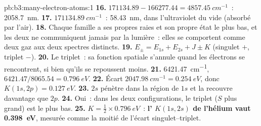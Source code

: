 \begin{solution}{pb:b3:many-electron-atoms:1}
\textbf{16.} $171134.89 - 166277.44 = \qty{4857.45}{cm^{-1}}$~: \qty{2058.7}{nm}.
\textbf{17.} $\qty{171134.89}{cm^{-1}}$~: \qty{58.43}{nm}, dans
l'ultraviolet du vide (absorbé par l'air).
\textbf{18.} Chaque famille a ses propres raies et son propre état le plus
bas, et les deux ne communiquent jamais par la lumière~: elles se
comportent comme deux gaz aux deux spectres distincts.
\textbf{19.} $E_\pm = E_{1s} + E_{2s} + J \pm K$ (singulet $+$, triplet $-$).
\textbf{20.} Le triplet~: sa fonction spatiale s'annule quand les
électrons se rencontrent, si bien qu'ils se repoussent moins.
\textbf{21.} \qty{6421.47}{cm^{-1}}, $6421.47/8065.54 = \qty{0.796}{eV}$.
\textbf{22.} Écart $\qty{2047.98}{cm^{-1}} = \qty{0.254}{eV}$, donc $K(1s,2p) =
\qty{0.127}{eV}$.
\textbf{23.} $2s$ pénètre dans la région de $1s$ et la recouvre davantage
que $2p$.
\textbf{24.} Oui~: dans les deux configurations, le triplet ($S$ plus
grand) est le plus bas.
\textbf{25.} $K = \frac12 \times \qty{0.796}{eV}$~: \textbf{l' $K(1s,2s)$ de l'hélium vaut \qty{0.398}{eV}}, mesurée comme la
moitié de l'écart singulet--triplet.
\end{solution}
